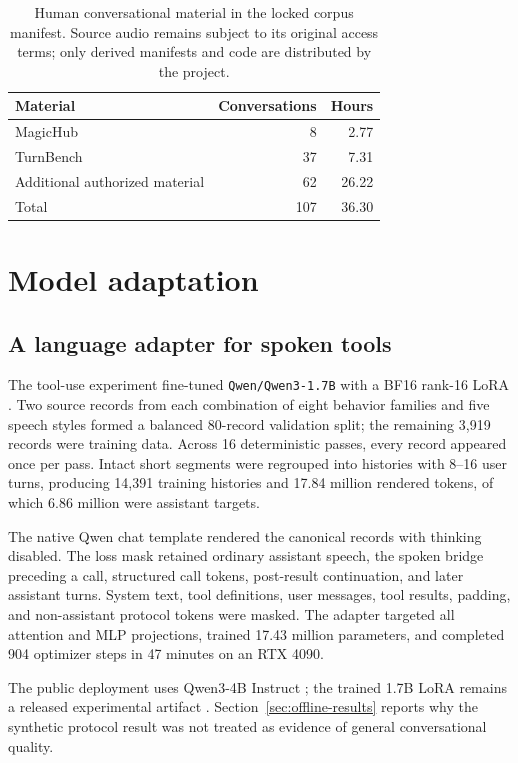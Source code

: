 \documentclass[10pt,twocolumn]{article}
\newcommand{\code}[1]{\texttt{#1}}
\begin{document}
\begin{table}[t]
\centering
\caption{Human conversational material in the locked corpus manifest. Source audio remains subject
to its original access terms; only derived manifests and code are distributed by the project.}
\footnotesize
\begin{tabularx}{\columnwidth}{Xrr}
\toprule
Material & Conversations & Hours \\
\midrule
MagicHub & 8 & 2.77 \\
TurnBench & 37 & 7.31 \\
Additional authorized material & 62 & 26.22 \\
\midrule
Total & 107 & 36.30 \\
\bottomrule
\end{tabularx}
\label{tab:human-data}
\end{table}

\section{Model adaptation}

\subsection{A language adapter for spoken tools}

The tool-use experiment fine-tuned \code{Qwen/Qwen3-1.7B} \cite{qwen3} with a BF16 rank-16 LoRA \cite{lora}. Two source
records from each combination of eight behavior families and five speech styles formed a balanced
80-record validation split; the remaining 3,919 records were training data. Across 16 deterministic
passes, every record appeared once per pass. Intact short segments were regrouped into histories
with 8--16 user turns, producing 14,391 training histories and 17.84 million rendered tokens, of
which 6.86 million were assistant targets.

The native Qwen chat template rendered the canonical records with thinking disabled. The loss mask
retained ordinary assistant speech, the spoken bridge preceding a call, structured call tokens,
post-result continuation, and later assistant turns. System text, tool definitions, user messages,
tool results, padding, and non-assistant protocol tokens were masked. The adapter targeted all
attention and MLP projections, trained 17.43 million parameters, and completed 904 optimizer steps
in 47 minutes on an RTX 4090.

The public deployment uses Qwen3-4B Instruct \cite{qwen4}; the trained 1.7B LoRA remains a released
experimental artifact \cite{toollora,toolmerged}. Section~\ref{sec:offline-results} reports why the
synthetic protocol result was not treated as evidence of general conversational quality.
\end{document}

